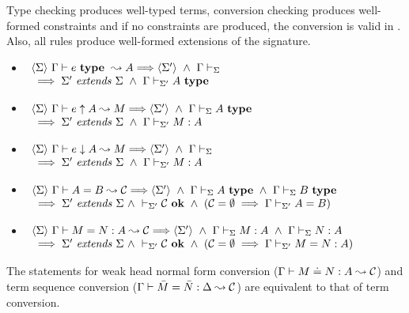 \begin{theorem} \label{thmSoundNoCs}
    Type checking produces well-typed terms, conversion checking produces
    well-formed constraints and if no constraints are produced, the conversion
    is valid in {\Core}. Also, all rules produce well-formed extensions of the
    signature.
\if {}
    \begin{itemize}

	\item
	    $\begin{array}[t]{l}
		\langle {\Sigma} \rangle ~ {{\Gamma} \vdash {e} ~ \mathbf{type} ~ \leadsto {A}} \Longrightarrow \langle {\Sigma'} \rangle
		~ \wedge ~ {\Gamma} \vdash_{\Sigma} \\
		{} \implies {\Sigma'} ~ \mathit{extends} ~ {\Sigma}
		~ \wedge ~ {\Gamma} \vdash_{\Sigma'}A ~ \mathbf{type}
	    \end{array}$

	\item
	    $\begin{array}[t]{l}
		\langle {\Sigma} \rangle ~ {{\Gamma} \vdash {e} \uparrow {A} \leadsto {M}} \Longrightarrow \langle {\Sigma'} \rangle
		~ \wedge ~ {\Gamma} \vdash_{\Sigma}A ~ \mathbf{type} \\
		{} \implies {\Sigma'} ~ \mathit{extends} ~ {\Sigma}
		~ \wedge ~ {\Gamma} \vdash_{\Sigma'} {M} : {A}
	    \end{array}$

	\item
	    $\begin{array}[t]{l}
		\langle {\Sigma} \rangle ~ {{\Gamma} \vdash {e} \downarrow {A} \leadsto {M}} \Longrightarrow \langle {\Sigma'} \rangle
		~ \wedge ~ {\Gamma} \vdash_{\Sigma} \\
		{} \implies {\Sigma'} ~ \mathit{extends} ~ {\Sigma}
		~ \wedge ~ {\Gamma} \vdash_{\Sigma'} {M} : {A}
	    \end{array}$

	\item
	    $\begin{array}[t]{l}
		\langle {\Sigma} \rangle ~ {{\Gamma} \vdash {A} = {B} \leadsto {\mathcal{C}}} \Longrightarrow \langle {\Sigma'} \rangle
		~ \wedge ~ {\Gamma} \vdash_{\Sigma}A ~ \mathbf{type}
		~ \wedge ~ {\Gamma} \vdash_{\Sigma}B ~ \mathbf{type}
		\\
		{} \implies {\Sigma'} ~ \mathit{extends} ~ {\Sigma}
		~ \wedge ~ \vdash_{\Sigma'} {\mathcal{C}} ~ \mathbf{ok}
		~ \wedge ~ (\mathcal{C} = \emptyset \implies {\Gamma} \vdash_{\Sigma'}A=B)
	    \end{array}$

	\item
	    $\begin{array}[t]{l}
		\langle {\Sigma} \rangle ~ {{\Gamma} \vdash {M} = {N} : {A} \leadsto {\mathcal{C}}} \Longrightarrow \langle {\Sigma'} \rangle
		~ \wedge ~ {\Gamma} \vdash_{\Sigma} {M} : {A}
		~ \wedge ~ {\Gamma} \vdash_{\Sigma} {N} : {A}
		\\
		{} \implies {\Sigma'} ~ \mathit{extends} ~ {\Sigma}
		~ \wedge ~ \vdash_{\Sigma'} {\mathcal{C}} ~ \mathbf{ok}
		~ \wedge ~ (\mathcal{C} = \emptyset \implies {\Gamma} \vdash_{\Sigma'}M=N:A)
	    \end{array}$

    \end{itemize}

    The statements for weak head normal form conversion (${\Gamma} \vdash {M} \doteq {N} : {A} \leadsto {\mathcal{C}}$) and term sequence conversion (${\Gamma} \vdash {\bar M} = {\bar N} : {\Delta} \leadsto {\mathcal{C}}$)
    are equivalent to that of term conversion.
\fi
\end{theorem}

